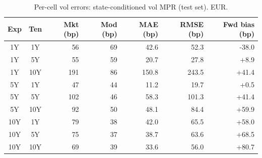 \begin{table}[H]
\centering
\caption{Per-cell vol errors: state-conditioned vol MPR (test set). EUR.}
\label{tab:state_vol_mpr_per_cell_test}
\small
\begin{tabular}{@{}ccrrrrr@{}}
\toprule
\textbf{Exp} & \textbf{Ten} & \textbf{Mkt (bp)} & \textbf{Mod (bp)} & \textbf{MAE (bp)} & \textbf{RMSE (bp)} & \textbf{Fwd bias (bp)} \\
\midrule
  1Y & 1Y & 56 & 69 & 42.6 & 52.3 & -38.0 \\
  1Y & 5Y & 55 & 59 & 20.7 & 27.8 & +8.9 \\
  1Y & 10Y & 191 & 86 & 150.8 & 243.5 & +41.4 \\
  \midrule
  5Y & 1Y & 47 & 44 & 11.2 & 19.7 & +0.5 \\
  5Y & 5Y & 102 & 46 & 58.3 & 101.3 & +41.4 \\
  5Y & 10Y & 92 & 50 & 48.1 & 84.4 & +59.9 \\
  \midrule
  10Y & 1Y & 79 & 38 & 42.0 & 65.5 & +58.0 \\
  10Y & 5Y & 75 & 37 & 38.7 & 63.6 & +68.5 \\
  10Y & 10Y & 69 & 39 & 33.6 & 56.0 & +80.7 \\
\bottomrule
\end{tabular}
\end{table}